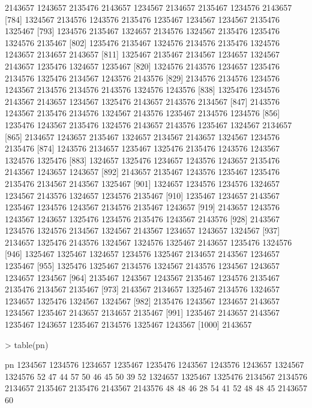 \documentclass{scrartcl}
\begin{document}
\begin{Schunk}
\begin{Soutput}
 [775] 2143657 1243657 2135476 2143657 1234567 2134657 2135467 1234576 2143657
 [784] 1324567 2134576 1243576 2135476 1235467 1234567 1234567 2135476 1325467
 [793] 1234576 2135467 1324657 2134576 1324567 2135476 1235476 1324576 2135467
 [802] 1235476 2135467 1324576 2134576 2135476 1324576 1243657 2134657 2143657
 [811] 1325467 2135467 2134567 1234657 1324567 2143657 1235476 1324657 1235467
 [820] 1324576 2143576 1234657 1235476 2134576 1325476 2134567 1243576 2143576
 [829] 2134576 2134576 1234576 1243567 2134576 2134576 2143576 1324576 1243576
 [838] 1325476 1234576 2143567 2143657 1234567 1325476 2143657 2143576 2134567
 [847] 2143576 1243567 2135476 2134576 1324567 2143576 1235467 2134576 1234576
 [856] 1235476 1243567 2135476 1324576 2143657 2143576 1235467 1324567 2134657
 [865] 2134657 1243657 2135467 1324657 2134567 2143657 1324567 1234576 2135476
 [874] 1243576 2134657 1235467 1325476 2135476 1243576 1243567 1324576 1325476
 [883] 1324657 1325476 1234657 1243576 1243657 2135476 2143567 1243657 1243657
 [892] 2143657 2135467 1243576 1235467 1235476 2135476 2134567 2143567 1325467
 [901] 1324657 1234576 1234576 1324657 1234567 2143576 1324657 1234576 2135467
 [910] 1235467 1234657 2143567 1235467 1234576 1243567 2134576 2135467 1243657
 [919] 2143657 1243576 1243567 1243657 1325476 1234576 2135476 1243567 2143576
 [928] 2143567 1234576 1324576 2134567 1324567 2143567 1234657 1243657 1324567
 [937] 2134657 1325476 2143576 1324567 1324576 1325467 2143657 1235476 1324576
 [946] 1325467 1325467 1324657 1234576 1325467 2134657 2143567 1234657 1235467
 [955] 1325476 1325467 2134576 1324567 2143576 1234567 1243657 1234657 1234567
 [964] 2135467 1243567 1243567 2135467 1234576 2135467 2135476 2134567 2135467
 [973] 2143567 2134657 1325467 2134576 1324657 1234657 1325476 1324567 1324567
 [982] 2135476 1243567 1234657 2143657 1234567 1235467 2143657 2134657 2135467
 [991] 1235467 2143657 2143567 1235467 1243657 1235467 2134576 1325467 1243567
[1000] 2143657
\end{Soutput}
\begin{Sinput}
> table(pn)
\end{Sinput}
\begin{Soutput}
pn
1234567 1234576 1234657 1235467 1235476 1243567 1243576 1243657 1324567 1324576 
     52      47      44      57      50      46      45      50      39      52 
1324657 1325467 1325476 2134567 2134576 2134657 2135467 2135476 2143567 2143576 
     48      48      46      28      54      41      52      48      48      45 
2143657 
     60 
\end{Soutput}
\end{Schunk}
\end{document}

